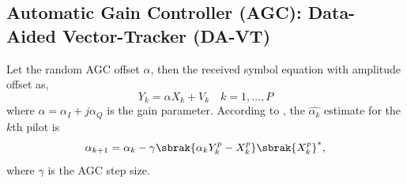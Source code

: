 \documentclass[journal,12pt,twocolumn]{IEEEtran}
\begin{document}
\subsection{Automatic Gain Controller (AGC): Data-Aided Vector-Tracker (DA-VT) }
Let the random AGC offset $\alpha$, then the received symbol equation with amplitude offset as,
\begin{equation}
\label{eq:AGC model}
Y_k = \alpha X_k +V_k  \quad k = 1,\dots,P
\end{equation}
%
where $\alpha = \alpha_I+j\alpha_Q$ is the gain parameter.
According to \cite{agc}, the $\hat{\alpha_k}$ estimate for the $k$th pilot is
%
\begin{equation}
\alpha_{k+1}=
\alpha_k-\gamma\sbrak{\alpha_k Y^p_k - X^p_k}\sbrak{X^p_k}^*, 
\end{equation}
%
where $\gamma$ is the AGC step size.
%
\end{document}
